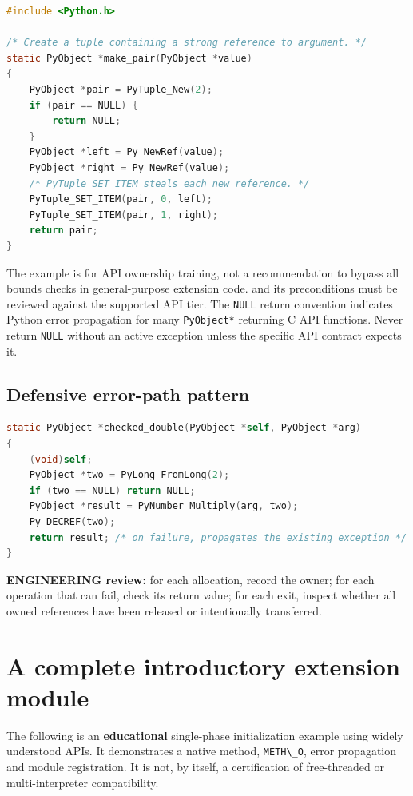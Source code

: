 \documentclass[
  11pt,
]{report}
\newcommand{\passthrough}[1]{#1}
\begin{document}
\begin{lstlisting}[language=C]
#include <Python.h>

/* Create a tuple containing a strong reference to argument. */
static PyObject *make_pair(PyObject *value)
{
    PyObject *pair = PyTuple_New(2);
    if (pair == NULL) {
        return NULL;
    }
    PyObject *left = Py_NewRef(value);
    PyObject *right = Py_NewRef(value);
    /* PyTuple_SET_ITEM steals each new reference. */
    PyTuple_SET_ITEM(pair, 0, left);
    PyTuple_SET_ITEM(pair, 1, right);
    return pair;
}
\end{lstlisting}

The example is for API ownership training, not a recommendation to
bypass all bounds checks in general-purpose extension code.
 and its preconditions must
be reviewed against the supported API tier. The
\passthrough{\lstinline!NULL!} return convention indicates Python error
propagation for many \passthrough{\lstinline!PyObject*!} returning C API
functions. Never return \passthrough{\lstinline!NULL!} without an active
exception unless the specific API contract expects it.

\section{Defensive error-path
pattern}\label{defensive-error-path-pattern}

\begin{lstlisting}[language=C]
static PyObject *checked_double(PyObject *self, PyObject *arg)
{
    (void)self;
    PyObject *two = PyLong_FromLong(2);
    if (two == NULL) return NULL;
    PyObject *result = PyNumber_Multiply(arg, two);
    Py_DECREF(two);
    return result; /* on failure, propagates the existing exception */
}
\end{lstlisting}

\textbf{ENGINEERING review:} for each allocation, record the owner; for
each operation that can fail, check its return value; for each exit,
inspect whether all owned references have been released or intentionally
transferred.

\chapter{A complete introductory extension
module}\label{a-complete-introductory-extension-module}

The following is an \textbf{educational} single-phase initialization
example using widely understood APIs. It demonstrates a native method,
\passthrough{\lstinline!METH\_O!}, error propagation and module
registration. It is not, by itself, a certification of free-threaded or
multi-interpreter compatibility.
\end{document}
